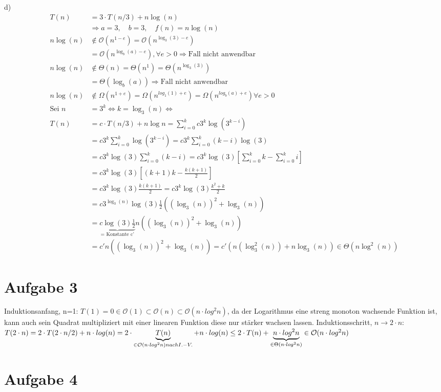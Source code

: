 \documentclass[a4paper,10pt,oneside,leqno]{scrartcl}
\begin{document}
d)\\
\begin{align*}
   T(n)&= 3 \cdot T(n/3) + n \log(n)\\
    &\Longrightarrow a = 3, \quad b = 3, \quad f(n) = n \log (n) \\
    n \log(n) &\notin \mathcal{O}(n^{1-e}) = \mathcal{O}(n^{\log_3(3)-e})\\
      &= \mathcal{O}(n^{\log_b(a)-e}), \forall e > 0 \Longrightarrow \text{Fall nicht anwendbar}\\
    n \log(n) &\notin \Theta(n) = \Theta(n^1) = \Theta(n^{\log_3(3)})\\
      &= \Theta(\log_b(a)) \Longrightarrow \text{Fall nicht anwendbar}\\
    n \log(n) &\notin \Omega(n^{1+e}) = \Omega(n^{log_1(1)+e}) = \Omega(n^{log_b(a)+e}) \forall e > 0\\
    \text{Sei } n &= 3^k \iff k = \log_3(n) \iff\\
    T(n) &= c \cdot T(n/3) + n \log n = \sum_{i=0}^{k} c 3^k \log(3^{k-i})\\
    &= c3^{k} \sum_{i=0}^{k} \log(3^{k-i}) = c3^k \sum_{i=0}^{k}(k-i)\log(3)\\
    &= c3^k\log(3) \sum_{i=0}^{k}(k-i) = c3^k\log(3) \left[\sum_{i=0}^{k}k-\sum_{i=0}^{k}i\right]\\
    &= c3^k\log(3) \left[ (k+1)k - \frac{k(k+1)}{2} \right]\\
    &= c3^k\log(3) \frac{k(k+1)}{2} = c3^k\log(3) \frac{k^2+k}{2}\\
    &= c3^{\log_3(n)}\log(3)\frac{1}{2}((\log_3(n))^2+\log_3(n))\\
    &= \underbrace{c\log(3)\frac{1}{2}}_{\text{= Konstante c'}}n((\log_3(n))^2+\log_3(n))\\
    &= c' n((\log_3(n))^2+\log_3(n)) = c' (n(\log_3^2(n))+n\log_3(n)) \in \Theta(n \log^2(n))
\end{align*}
\section*{Aufgabe 3}
Induktionsanfang, n=1:\newline
$T(1) = 0 \in \mathcal{O}(1) \subset \mathcal{O}(n) \subset \mathcal{O}(n\cdot log^2 n)$, da der Logarithmus eine streng monoton wachsende
Funktion ist, kann auch sein Quadrat multipliziert mit einer linearen Funktion diese nur stärker wachsen lassen.\newline
Induktionsschritt, $n\rightarrow 2\cdot n$:\newline
$T(2\cdot n) = 2\cdot T(2\cdot n/2)+n\cdot log(n) = 2\cdot \underbrace{T(n)}_{\in \mathcal{O}(n\cdot log^2 n)\newline nach I.-V.}+n\cdot log(n)
\leq 2\cdot T(n) + \underbrace{n\cdot log^2 n}_{\in \Theta(n\cdot log^2 n)}\in \mathcal{O}(n\cdot log^2 n)$
\section*{Aufgabe 4}
\end{document}
